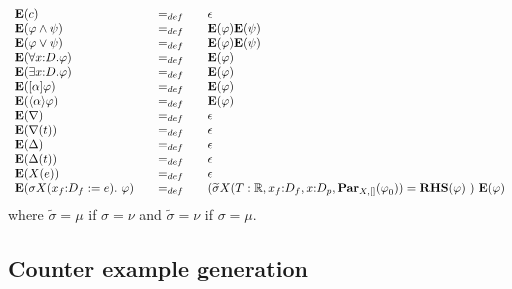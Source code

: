 \begin{equation*}
\begin{array}{lll}
{\mathbf{E}}(c) & =_{def} & \epsilon \\ 
{\mathbf{E}}(\varphi \wedge \psi ) & =_{def} & {\mathbf{E}}(\varphi ){%
\mathbf{E}}(\psi ) \\ 
{\mathbf{E}}(\varphi \vee \psi ) & =_{def} & {\mathbf{E}}(\varphi ){\mathbf{E%
}}(\psi ) \\ 
{\mathbf{E}}(\forall {x{:}D}.\varphi ) & =_{def} & {\mathbf{E}}(\varphi ) \\ 
{\mathbf{E}}(\exists {x{:}D}.\varphi ) & =_{def} & {\mathbf{E}}(\varphi ) \\ 
{\mathbf{E}}([\alpha ]\varphi ) & =_{def} & {\mathbf{E}}(\varphi ) \\ 
{\mathbf{E}}(\langle \alpha \rangle \varphi ) & =_{def} & {\mathbf{E}}%
(\varphi ) \\ 
{\mathbf{E}}(\nabla ) & =_{def} & \epsilon \\ 
{\mathbf{E}}(\nabla (t)) & =_{def} & \epsilon \\ 
{\mathbf{E}}(\Delta ) & =_{def} & \epsilon \\ 
{\mathbf{E}}(\Delta (t)) & =_{def} & \epsilon \\ 
{\mathbf{E}}(X(e)) & =_{def} & \epsilon \\ 
{\mathbf{E}}(\sigma X(x_{f}{:}D_{f}:=e).~\varphi )~~~ & =_{def}~~~ & (%
\widetilde{\sigma }X(T:\mathbb{R},x_{f}{:}D_{f},x{:}D_{p},\mathbf{Par}%
_{X,[]}(\varphi _{0}))={\mathbf{RHS}}(\varphi )~)~{\mathbf{E}}(\varphi )%
\end{array}%
\end{equation*}%
where $\widetilde{\sigma }=\mu $ if $\sigma =\nu $ and $\widetilde{\sigma }%
=\nu $ if $\sigma =\mu $.

\subsection{Counter example generation}


